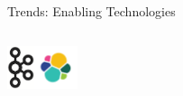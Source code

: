 \documentclass{beamer}
\begin{document}
\begin{frame}{Trends:  Enabling Technologies}
\begin{columns}
\begin{column}{.5\textwidth}
      \vspace*{12pt}

      \includegraphics[height=1.25cm]{kafka_logo.png}\includegraphics[height=1.25cm]{elasticsearch.png}

    \end{column}
  \end{columns}

\end{frame}
\end{document}
